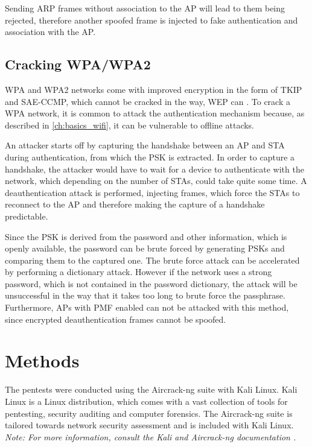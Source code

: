 Sending ARP frames without association to the AP will lead to them being rejected, therefore another spoofed frame is injected to fake authentication and association with the AP.

\subsection{Cracking WPA/WPA2}
WPA and WPA2 networks come with improved encryption in the form of TKIP and SAE-CCMP, which cannot be cracked in the way, WEP can \cite{Oriyano_2017}.
To crack a WPA network, it is common to attack the authentication mechanism because, as described in \cref{ch:basics_wifi}, it can be vulnerable to offline attacks.

An attacker starts off by capturing the handshake between an AP and STA during authentication, from which the PSK is extracted.
In order to capture a handshake, the attacker would have to wait for a device to authenticate with the network, which depending on the number of STAs, could take quite some time.
A deauthentication attack is performed, injecting frames, which force the STAs to reconnect to the AP and therefore making the capture of a handshake predictable.

Since the PSK is derived from the password and other information, which is openly available, the password can be brute forced by generating PSKs and comparing them to the captured one.
The brute force attack can be accelerated by performing a dictionary attack.
However if the network uses a strong password, which is not contained in the password dictionary, the attack will be unsuccessful in the way that it takes too long to brute force the passphrase.
Furthermore, APs with PMF enabled can not be attacked with this method, since encrypted deauthentication frames cannot be spoofed.

\section{Methods}\label{sec:testing_methods}
The pentests were conducted using the Aircrack-ng suite with Kali Linux.
Kali Linux is a Linux distribution, which comes with a vast collection of tools for pentesting, security auditing and computer forensics.
The Aircrack-ng suite is tailored towards network security assessment and is included with Kali Linux.
\\\textit{Note: For more information, consult the Kali and Aircrack-ng documentation \cite{aircrack_ng}\cite{kali_docs}.}

